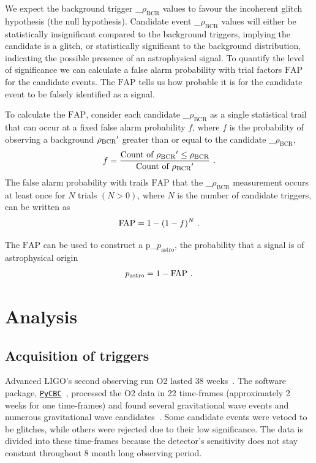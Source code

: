\documentclass[%
 nofootinbib,
 amsmath,amssymb,
 aps,
 twocolumn
]{revtex4-2}
\newcommand{\pycbc}{{\sc \href{https://pycbc.org/}{\texttt{PyCBC}}}\xspace}
\newcommand{\fancytext}[1]{{\relax\ifmmode#1\else $#1$\fi}\xspace}
\newcommand{\mathcmd}[1]{{\sc \relax\ifmmode#1\else $#1$\fi}\xspace}
\newcommand{\bcr}{\mathcmd{\rho_\text{BCR}}}
\newcommand{\fap}{\mathcmd{\text{FAP}}}
\newcommand{\pastro}{\fancytext{p_\text{astro}}}
\begin{document}
We expect the background trigger \bcr values to favour the incoherent glitch hypothesis (the null hypothesis). Candidate event \bcr values will either be statistically insignificant compared to the background triggers, implying the candidate is a glitch, or statistically significant to the background distribution, indicating the possible presence of an astrophysical signal. To quantify the level of significance we can calculate a false alarm probability with trial factors \fap for the candidate events. The \fap tells us how probable it is for the candidate event to be falsely identified as a signal.

To calculate the \fap, consider each candidate \bcr as a single statistical trail that can occur at a fixed false alarm probability $f$, where $f$ is the probability of observing a background $\bcr'$ greater than or equal to the candidate \bcr,
\begin{equation}
    f = \frac{\text{Count of } \bcr' \leq \bcr}{\text{Count of } \bcr'} \ .
\end{equation}
The false alarm probability with trails \fap that the \bcr measurement occurs at least once for $N$ trials $(N > 0)$, where $N$ is the number of candidate triggers, can be written as
\begin{equation}
    \fap = 1 - (1-f)^N \ .
\end{equation}

The \fap can be used to construct a \pastro, the probability that a signal is of astrophysical origin~\cite{pastro_1,pastro_2,pastro_3}
\begin{equation}
    \pastro = 1 -  \fap \ .
\end{equation}



\section{Analysis}\label{sec:Analysis}

\subsection{Acquisition of triggers}
Advanced LIGO's second observing run O2 lasted $38$ weeks~\cite{GWOSC}. The software package, \pycbc~\cite{pycbc_code}, processed the O2 data in 22 time-frames (approximately 2 weeks for one time-frames) and found several gravitational wave events and numerous gravitational wave candidates~\cite{pycbc_og0, pycbc_og1, pycbc_og2, pycbc_og3, pycbc_og4, pycbc_og5, pycbc_og6}. Some candidate events were vetoed to be glitches, while others were rejected due to their low significance. The data is divided into these time-frames because the detector's sensitivity does not stay constant throughout 8 month long observing period.
\end{document}
